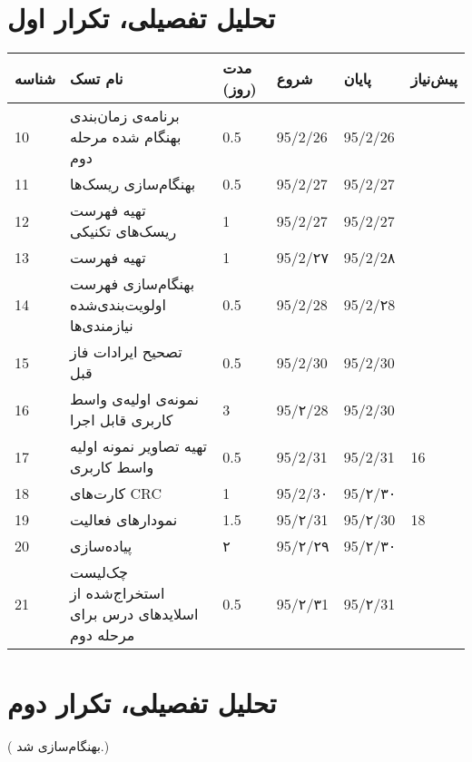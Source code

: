 \section{تحلیل تفصیلی، تکرار اول}	
\begin{tabular}[H]{ | l | l | l | l | l | l | }
	\hline
	شناسه & نام تسک & مدت (روز) & شروع & پایان & پیش‌نیاز    \\ \hline
	10 & برنامه‌ی زمان‌بندی‌ بهنگام شده مرحله دوم & 0.5   &   95/2/26 &   95/2/26 &      \\ \hline
	11 & بهنگام‌سازی ریسک‌ها & 0.5   &   95/2/27 &   95/2/27 &      \\ \hline
	12 & تهیه  فهرست ریسک‌های تکنیکی & 1   &   95/2/27 &   95/2/27 &      \\ \hline
	13 & تهیه فهرست \lr{Architecturally Significant Requirements} & 1   &   95/2/۲۷ &   95/2/2۸ &      \\ \hline
	14 &  بهنگام‌سازی فهرست اولویت‌بندی‌شده نیازمندی‌ها & 0.5   &   95/2/28 &   95/2/۲8 &      \\ \hline
	15&  تصحیح ایرادات فاز قبل & 0.5   &   95/2/30 &   95/2/30 &      \\ \hline
	16 & نمونه‌ی اولیه‌ی واسط کاربری قابل اجرا & 3 &   95/۲/28 &   95/2/30 &  \\ \hline
	17 & تهیه تصاویر نمونه اولیه واسط کاربری  & 0.5 & 95/2/31 &   95/2/31 & 16 \\ \hline
	18 & کارت‌های CRC & 1   &   95/2/3۰ &   95/۲/۳۰ &      \\ \hline
	19 & نمودارهای فعالیت  & 1.5  &   95/۲/31 &   95/۲/30 &   18   \\ \hline
	20 & پیاده‌سازی \lr{Executable Architectural Baseline} & ۲   &   95/۲/۲۹ &   95/۲/۳۰ &      \\ \hline
	21 &  چک‌لیست استخراج‌شده از اسلایدهای درس برای مرحله دوم &  0.5 &   95/۲/۳1 &   95/۲/31 &  \\ \hline
\end{tabular}

\newpage
\section{تحلیل تفصیلی، تکرار دوم}
({\color{red} بهنگام‌سازی شد.})

